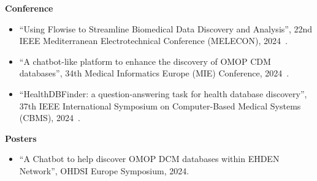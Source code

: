 \noindent \textbf{Conference}

\begin{itemize}
    \item ``Using Flowise to Streamline Biomedical Data Discovery and Analysis'', 22nd IEEE Mediterranean Electrotechnical Conference (MELECON), 2024~\cite{reis2024flowise}.
    \item ``A chatbot-like platform to enhance the discovery of OMOP CDM databases'', 34th Medical Informatics Europe (MIE) Conference, 2024~\cite{reis2024chatbotlike}.
    \item ``HealthDBFinder: a question-answering task for health database discovery'', 37th IEEE International Symposium on Computer-Based Medical Systems (CBMS), 2024~\cite{almeida2024healthdbfinder}.
\end{itemize}


\noindent \textbf{Posters}

\begin{itemize}
    \item ``A Chatbot to help discover OMOP DCM databases within EHDEN Network'', OHDSI Europe Symposium, 2024.
\end{itemize}
